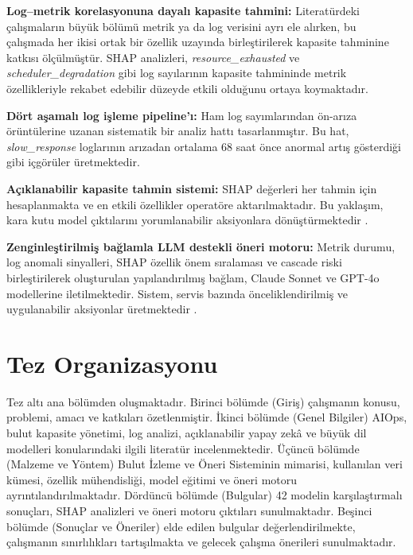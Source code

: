 \begin{maddelendir}[label=\arabic*.]
    \item \textbf{Log--metrik korelasyonuna dayalı kapasite tahmini:}
    Literatürdeki çalışmaların büyük bölümü metrik ya da log verisini ayrı ele alırken, bu çalışmada her ikisi ortak bir özellik uzayında birleştirilerek kapasite tahminine katkısı ölçülmüştür.
    SHAP analizleri, \textit{resource\_exhausted} ve \textit{scheduler\_degradation} gibi log sayılarının kapasite tahmininde metrik özellikleriyle rekabet edebilir düzeyde etkili olduğunu ortaya koymaktadır.

    \item \textbf{Dört aşamalı log işleme pipeline'ı:}
    Ham log sayımlarından ön-arıza örüntülerine uzanan sistematik bir analiz hattı tasarlanmıştır.
    Bu hat, \textit{slow\_response} loglarının arızadan ortalama 68 saat önce anormal artış gösterdiği gibi içgörüler üretmektedir.

    \item \textbf{Açıklanabilir kapasite tahmin sistemi:}
    SHAP değerleri her tahmin için hesaplanmakta ve en etkili özellikler operatöre aktarılmaktadır.
    Bu yaklaşım, kara kutu model çıktılarını yorumlanabilir aksiyonlara dönüştürmektedir \autocite{lundberg2017, lundberg2020}.

    \item \textbf{Zenginleştirilmiş bağlamla LLM destekli öneri motoru:}
    Metrik durumu, log anomali sinyalleri, SHAP özellik önem sıralaması ve cascade riski birleştirilerek oluşturulan yapılandırılmış bağlam, Claude Sonnet ve GPT-4o modellerine iletilmektedir.
    Sistem, servis bazında önceliklendirilmiş ve uygulanabilir aksiyonlar üretmektedir \autocite{brown2020, openai2023}.
\end{maddelendir}


\section{Tez Organizasyonu}

Tez altı ana bölümden oluşmaktadır.
Birinci bölümde (Giriş) çalışmanın konusu, problemi, amacı ve katkıları özetlenmiştir.
İkinci bölümde (Genel Bilgiler) AIOps, bulut kapasite yönetimi, log analizi, açıklanabilir yapay zekâ ve büyük dil modelleri konularındaki ilgili literatür incelenmektedir.
Üçüncü bölümde (Malzeme ve Yöntem) Bulut İzleme ve Öneri Sisteminin mimarisi, kullanılan veri kümesi, özellik mühendisliği, model eğitimi ve öneri motoru ayrıntılandırılmaktadır.
Dördüncü bölümde (Bulgular) 42 modelin karşılaştırmalı sonuçları, SHAP analizleri ve öneri motoru çıktıları sunulmaktadır.
Beşinci bölümde (Sonuçlar ve Öneriler) elde edilen bulgular değerlendirilmekte, çalışmanın sınırlılıkları tartışılmakta ve gelecek çalışma önerileri sunulmaktadır.
